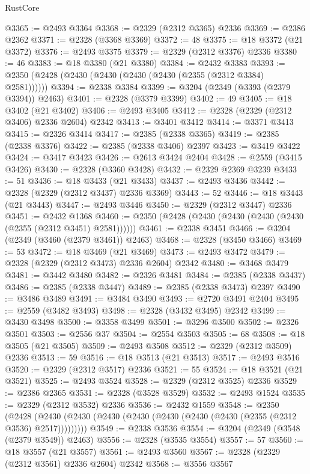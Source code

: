 \begin{lexlean}{RustCore}
\begin{coremodule}
@3365 := @2493 @3364
@3368 := @2329 (@2312 @3365) @2336
@3369 := @2386 @2362
@3371 := @2328 (@3368 @3369)
@3372 := 48
@3375 := @18 @3372 (@21 @3372)
@3376 := @2493 @3375
@3379 := @2329 (@2312 @3376) @2336
@3380 := 46
@3383 := @18 @3380 (@21 @3380)
@3384 := @2432 @3383
@3393 := @2350 (@2428 (@2430 (@2430 (@2430 (@2430 (@2355 (@2312 @3384) @2581))))))
@3394 := @2338 @3384
@3399 := @3204 (@2349 (@3393 (@2379 @3394)) @2463)
@3401 := @2328 (@3379 @3399)
@3402 := 49
@3405 := @18 @3402 (@21 @3402)
@3406 := @2493 @3405
@3412 := @2328 (@2329 (@2312 @3406) @2336 @2604) @2342
@3413 := @3401 @3412
@3414 := @3371 @3413
@3415 := @2326 @3414
@3417 := @2385 (@2338 @3365)
@3419 := @2385 (@2338 @3376)
@3422 := @2385 (@2338 @3406) @2397
@3423 := @3419 @3422
@3424 := @3417 @3423
@3426 := @2613 @3424 @2404
@3428 := @2559 (@3415 @3426)
@3430 := @2328 (@3360 @3428)
@3432 := @2329 @2369 @3239
@3433 := 51
@3436 := @18 @3433 (@21 @3433)
@3437 := @2493 @3436
@3442 := @2328 (@2329 (@2312 @3437) @2336 @3369)
@3443 := 52
@3446 := @18 @3443 (@21 @3443)
@3447 := @2493 @3446
@3450 := @2329 (@2312 @3447) @2336
@3451 := @2432 @1368
@3460 := @2350 (@2428 (@2430 (@2430 (@2430 (@2430 (@2355 (@2312 @3451) @2581))))))
@3461 := @2338 @3451
@3466 := @3204 (@2349 (@3460 (@2379 @3461)) @2463)
@3468 := @2328 (@3450 @3466)
@3469 := 53
@3472 := @18 @3469 (@21 @3469)
@3473 := @2493 @3472
@3479 := @2328 (@2329 (@2312 @3473) @2336 @2604) @2342
@3480 := @3468 @3479
@3481 := @3442 @3480
@3482 := @2326 @3481
@3484 := @2385 (@2338 @3437)
@3486 := @2385 (@2338 @3447)
@3489 := @2385 (@2338 @3473) @2397
@3490 := @3486 @3489
@3491 := @3484 @3490
@3493 := @2720 @3491 @2404
@3495 := @2559 (@3482 @3493)
@3498 := @2328 (@3432 @3495) @2342
@3499 := @3430 @3498
@3500 := @3358 @3499
@3501 := @3296 @3500
@3502 := @2326 @3501
@3503 := @2556 @37
@3504 := @2554 @3503
@3505 := 68
@3508 := @18 @3505 (@21 @3505)
@3509 := @2493 @3508
@3512 := @2329 (@2312 @3509) @2336
@3513 := 59
@3516 := @18 @3513 (@21 @3513)
@3517 := @2493 @3516
@3520 := @2329 (@2312 @3517) @2336
@3521 := 55
@3524 := @18 @3521 (@21 @3521)
@3525 := @2493 @3524
@3528 := @2329 (@2312 @3525) @2336
@3529 := @2386 @2365
@3531 := @2328 (@3528 @3529)
@3532 := @2493 @1524
@3535 := @2329 (@2312 @3532) @2336
@3536 := @2432 @1559
@3548 := @2350
    (@2428 (@2430 (@2430 (@2430 (@2430 (@2430 (@2430 (@2430 (@2355 (@2312 @3536) @2517)))))))))
@3549 := @2338 @3536
@3554 := @3204 (@2349 (@3548 (@2379 @3549)) @2463)
@3556 := @2328 (@3535 @3554)
@3557 := 57
@3560 := @18 @3557 (@21 @3557)
@3561 := @2493 @3560
@3567 := @2328 (@2329 (@2312 @3561) @2336 @2604) @2342
@3568 := @3556 @3567

\end{coremodule}
\end{lexlean}
